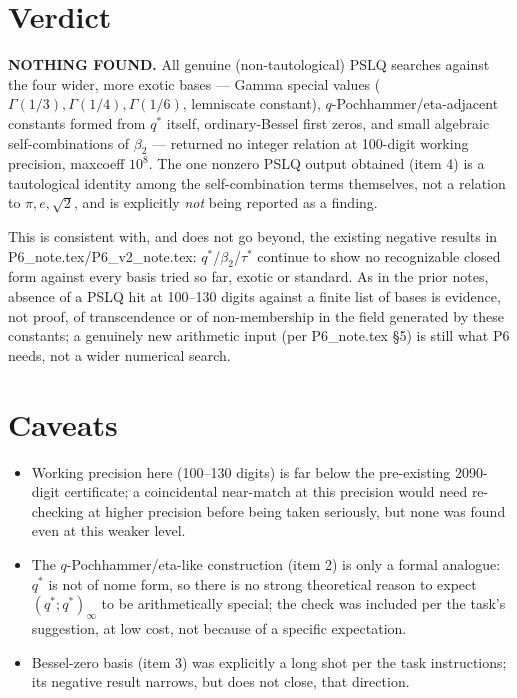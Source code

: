 \documentclass[11pt]{article}
\begin{document}
\section{Verdict}

\textbf{NOTHING FOUND.} All genuine (non-tautological) PSLQ searches against the four wider,
more exotic bases --- Gamma special values ($\Gamma(1/3),\Gamma(1/4),\Gamma(1/6)$, lemniscate
constant), $q$-Pochhammer/eta-adjacent constants formed from $q^\ast$ itself, ordinary-Bessel
first zeros, and small algebraic self-combinations of $\beta_2$ --- returned no integer relation
at 100-digit working precision, maxcoeff $10^8$. The one nonzero PSLQ output obtained (item 4)
is a tautological identity among the self-combination terms themselves, not a relation to
$\pi,e,\sqrt2$, and is explicitly \emph{not} being reported as a finding.

This is consistent with, and does not go beyond, the existing negative results in
P6\_note.tex/P6\_v2\_note.tex: $q^\ast$/$\beta_2$/$\tau^\ast$ continue to show no recognizable
closed form against every basis tried so far, exotic or standard. As in the prior notes, absence
of a PSLQ hit at 100--130 digits against a finite list of bases is evidence, not proof, of
transcendence or of non-membership in the field generated by these constants; a genuinely new
arithmetic input (per P6\_note.tex \S5) is still what P6 needs, not a wider numerical search.

\section{Caveats}
\begin{itemize}
\item Working precision here (100--130 digits) is far below the pre-existing 2090-digit
certificate; a coincidental near-match at this precision would need re-checking at higher
precision before being taken seriously, but none was found even at this weaker level.
\item The $q$-Pochhammer/eta-like construction (item 2) is only a formal analogue: $q^\ast$ is
not of nome form, so there is no strong theoretical reason to expect $(q^\ast;q^\ast)_\infty$ to
be arithmetically special; the check was included per the task's suggestion, at low cost, not
because of a specific expectation.
\item Bessel-zero basis (item 3) was explicitly a long shot per the task instructions; its
negative result narrows, but does not close, that direction.
\end{itemize}
\end{document}
